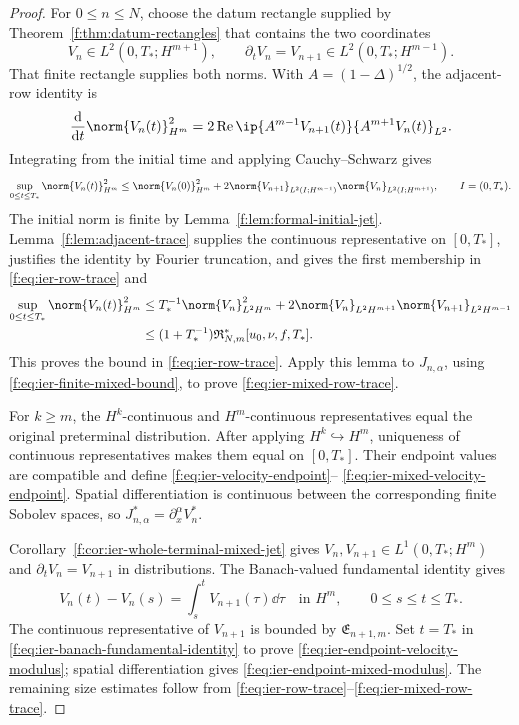\begin{proof}
For \(0\le n\le N\), choose the datum rectangle supplied by
Theorem~\ref{f:thm:datum-rectangles} that contains the two coordinates
\[
 V_n\in L^2(0,T_*;H^{m+1}),
 \qquad
 \partial_tV_n=V_{n+1}\in L^2(0,T_*;H^{m-1}).
\]
That finite rectangle supplies both norms.
With \(A=(1-\Delta)^{1/2}\), the adjacent-row identity is
\[
 \frac{\mathrm d}{\mathrm dt}\norm{V_n(t)}_{H^m}^2
 =2\operatorname{Re}\ip{A^{m-1}V_{n+1}(t)}{A^{m+1}V_n(t)}_{L^2}.
\]
Integrating from the initial time and applying Cauchy--Schwarz gives
\begin{equation}
 \sup_{0\le t\le T_*}\norm{V_n(t)}_{H^m}^2
 \le\norm{V_n(0)}_{H^m}^2
 +2\norm{V_{n+1}}_{L^2(I;H^{m-1})}
    \norm{V_n}_{L^2(I;H^{m+1})},
 \qquad I=(0,T_*).
 \label{f:eq:ier-initial-row-trace-bound}
\end{equation}
The initial norm is finite by Lemma~\ref{f:lem:formal-initial-jet}.
Lemma~\ref{f:lem:adjacent-trace} supplies the continuous representative
on \([0,T_*]\), justifies the identity by Fourier truncation, and gives the
first membership in
\eqref{f:eq:ier-row-trace} and
\begin{align*}
 \sup_{0\le t\le T_*}\norm{V_n(t)}_{H^m}^2
 &\le T_*^{-1}\norm{V_n}_{L^2H^m}^2
 +2\norm{V_n}_{L^2H^{m+1}}\norm{V_{n+1}}_{L^2H^{m-1}}\\
 &\le(1+T_*^{-1})\mathfrak R_{N,m}^*[u_0,\nu,f,T_*].
\end{align*}
This proves the bound in \eqref{f:eq:ier-row-trace}.  Apply this lemma to
\(J_{n,\alpha}\), using \eqref{f:eq:ier-finite-mixed-bound}, to prove
\eqref{f:eq:ier-mixed-row-trace}.

For \(k\ge m\), the \(H^k\)-continuous and \(H^m\)-continuous
representatives equal the original preterminal distribution.  After applying
\(H^k\hookrightarrow H^m\), uniqueness of continuous representatives makes
them equal on \([0,T_*]\).  Their endpoint values are compatible and define
\eqref{f:eq:ier-velocity-endpoint}--%
\eqref{f:eq:ier-mixed-velocity-endpoint}.  Spatial differentiation is
continuous between the corresponding finite Sobolev spaces, so
\(J_{n,\alpha}^*=\partial_x^\alpha V_n^*\).

Corollary~\ref{f:cor:ier-whole-terminal-mixed-jet} gives
\(V_n,V_{n+1}\in L^1(0,T_*;H^m)\) and
\(\partial_tV_n=V_{n+1}\) in distributions.  The Banach-valued fundamental
identity gives
\begin{equation}
 V_n(t)-V_n(s)=\int_s^tV_{n+1}(\tau)\dd\tau
 \quad\text{in }H^m,
 \qquad0\le s\le t\le T_*.
 \label{f:eq:ier-banach-fundamental-identity}
\end{equation}
The continuous representative of \(V_{n+1}\) is bounded by
\(\mathfrak E_{n+1,m}\).  Set \(t=T_*\) in
\eqref{f:eq:ier-banach-fundamental-identity} to prove
\eqref{f:eq:ier-endpoint-velocity-modulus}; spatial differentiation gives
\eqref{f:eq:ier-endpoint-mixed-modulus}.  The remaining size estimates follow
from \eqref{f:eq:ier-row-trace}--\eqref{f:eq:ier-mixed-row-trace}.


\end{proof}
